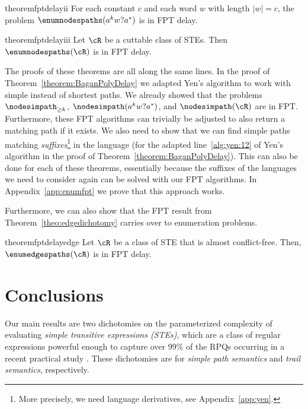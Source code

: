 \documentclass[a4paper,english]{lipics-v2016}
\theoremstyle{plain}
\begin{document}
\begin{restatable}{theorem}{fptdelayii}\label{theo:fptdelay:2}
  For each constant $c$ and each word $w$ with length $|w|=c$, the problem $\enumnodespaths(a^kw?a^*)$ is in FPT delay.
\end{restatable}

\begin{restatable}{theorem}{fptdelayiii}\label{theo:fptdelay:3}
  Let $\cR$ be a cuttable class of STEs. Then $\enumnodespaths(\cR)$ is in FPT delay.
\end{restatable}

The proofs of these theorems are all along the same lines. 
In the proof of Theorem~\ref{theorem:BaganPolyDelay} we adapted Yen's algorithm to work with simple instead of shortest paths. We already showed that the problems $\nodesimpath_{\geq k}$, $\nodesimpath(a^kw?a^*)$, and $\nodesimpath(\cR)$ are in FPT. Furthermore, these FPT algorithms can trivially be adjusted to also return a matching path if it exists. We also need to show that we can find simple paths matching \emph{suffixes}\footnote{More precisely, we need language derivatives, see Appendix~\ref{app:yen}.} in the language (for the adapted line~\ref{alg:yen:12} of Yen's algorithm in the proof of Theorem~\ref{theorem:BaganPolyDelay}). This can also be done for each of these theorems, essentially because the suffixes of the languages we need to consider again can be solved with our FPT algorithms.
In Appendix~\ref{app:enumfpt} we prove that this approach works.

Furthermore, we can also show that the FPT result from Theorem~\ref{theo:edgedichotomy} carries over to enumeration problems.
\begin{restatable}{theorem}{fptdelayedge}
	Let $\cR$ be a class of STE that is almost conflict-free. Then,
	$\enumedgespaths(\cR)$ is in FPT delay.
\end{restatable}





 

\makeatletter{}\section{Conclusions}

Our main results are two dichotomies on the parameterized complexity of
evaluating \emph{simple transitive expressions (STEs)}, which are a
class of regular expressions powerful enough to capture over 99\% of
the RPQs occurring in a recent practical study
\cite{BonifatiMT-corr17}. These dichotomies are for \emph{simple path
  semantics} and \emph{trail semantics}, respectively.
\end{document}
